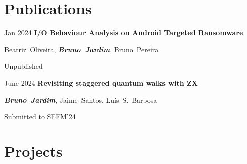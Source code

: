 \documentclass[10pt, letterpaper]{article}
\begin{document}
    
    \section{Publications}



        
        \begin{samepage}
            \begin{twocolentry}{
                Jan 2024
            }
                \textbf{I/O Behaviour Analysis on Android Targeted Ransomware}
            \end{twocolentry}

            \vspace{0.10 cm}
            
            \begin{onecolentry}
                \mbox{Beatriz Oliveira}, \mbox{\textbf{\textit{Bruno Jardim}}}, \mbox{Bruno Pereira}

                \vspace{0.10 cm}
            Unpublished
        \end{onecolentry}
        \end{samepage}

        \vspace{0.2 cm}

        \begin{samepage}
            \begin{twocolentry}{
                June 2024
            }
                \textbf{Revisiting staggered quantum walks with ZX}
            \end{twocolentry}

            \vspace{0.10 cm}
            
            \begin{onecolentry}
                \mbox{\textbf{\textit{Bruno Jardim}}}, \mbox{Jaime Santos}, \mbox{Luís S. Barbosa}

                \vspace{0.10 cm}
            Submitted to SEFM'24
        \end{onecolentry}
        \end{samepage}


    
    \section{Projects}
\end{document}
